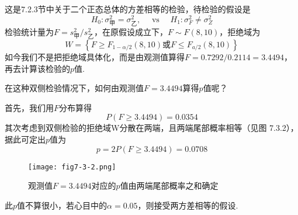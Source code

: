 \begin{solution}
这是7.2.3节中关于二个正态总体的方差相等的检验，待检验的假设是
\[H _ { 0 } : \sigma _ { \text{甲} } ^ { 2 } = \sigma _ { \text{乙} } ^ { 2 } , \quad \text { vs } \quad H _ { 1 } : \sigma _ { F } ^ { 2 } \neq \sigma _ { Z } ^ { 2 }\]
检验统计量为$F = s _ { \text{甲}  } ^ { 2 } / s _ { \text{乙}  } ^ { 2 }$，在原假设成立下，$F \sim F ( 8,10 )$，拒绝域为
\[
W=\left\{F\geq F_{1-\alpha/2}\left(8,10\right)\textrm{或}F\leq F_{a/2}\left(8,10\right)\right\}
\]
如今我们不是把拒绝域具体化，而是由观测值算得$F=0.7292/0.2114=
3.4494$，再去计算该检验的$p$值.

在这种双侧检验情况下，如何由观测值$F=3.4494$算得$p$值呢？

首先，我们用$F$分布算得
\[P ( F \geq 3.4494 ) = 0.0354\]
其次考虑到双侧检验的拒绝域W分散在两端，且两端尾部概率相等（见图
7.3.2），据此可定出$p$值为
\[p = 2 P ( F \geq 3.4494 ) = 0.0708\]
\begin{figure}[htbp]
	\centering
	\texttt{[image: fig7-3-2.png]}
	\caption{观测值$F=3.4494$对应的$p$值由两端尾部概率之和确定}\label{fig7.3.2}
\end{figure}
此$p$值不算很小，若心目中的$\alpha=0.05$，则接受两方差相等的假设.
\end{solution}
